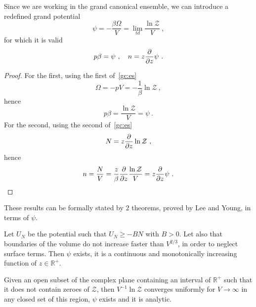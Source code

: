    Since we are working in the grand canonical ensemble, we can introduce a redefined grand potential
    \begin{equation*}
        \psi = - \frac{\beta \Omega}{V} = \lim_{td} \frac{\ln \mathcal Z}{V} ~,
    \end{equation*}
    for which it is valid 
    \begin{equation*}
        p \beta = \psi ~, \quad n = z \frac{\partial}{\partial z} \psi ~.
    \end{equation*}
    \begin{proof}
        For the first, using the first of~\eqref{gc:es}
        \begin{equation*}
            \Omega = - p V = - \frac{1}{\beta} \ln \mathcal Z ~,
        \end{equation*}
        hence
        \begin{equation*}
            p \beta = \frac{\ln \mathcal Z}{V} = \psi ~.
        \end{equation*}
        For the second, using the second of~\eqref{gc:es}
        \begin{equation*}
            N = z \frac{\partial}{\partial z} \ln \mathcal Z ~,
        \end{equation*}
        hence
        \begin{equation*}
            n = \frac{N}{V} = \frac{z}{\beta} \frac{\partial}{\partial z} \frac{\ln \mathcal Z}{V} =  z \frac{\partial}{\partial z} \psi ~.
        \end{equation*}
    \end{proof}
    These results can be formally stated by $2$ theorems, proved by Lee and Young, in terms of $\psi$.
    \begin{theorem}
        Let $U_N$ be the potential such that $U_N \geq - BN$ with $B > 0$. Let also that boundaries of the volume do not increase faster than $V^{2/3}$, in order to neglect surface terms. Then $\psi$ exists, it is a continuous and monotonically increasing function of $z \in \mathbb R^+$.
    \end{theorem}
    \begin{theorem}
        Given an open subset of the complex plane containing an interval of $\mathbb R^+$ such that it does not contain zeroes of $\mathcal Z$, then $V^{-1} \ln \mathcal Z$ converges uniformly for $V \rightarrow \infty$ in any closed set of this region, $\psi$ exists and it is analytic.
    \end{theorem}
